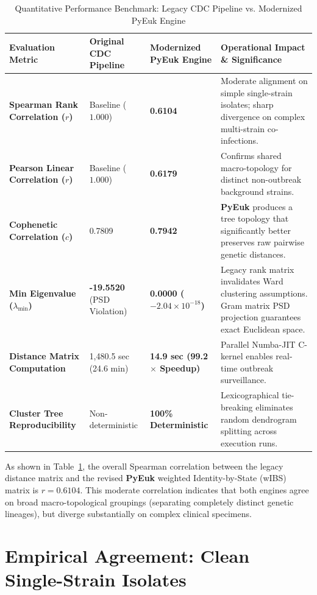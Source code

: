 \documentclass[11pt,a4paper]{article}
\begin{document}
\begin{table}[h]
\centering
\small
\caption{Quantitative Performance Benchmark: Legacy CDC Pipeline vs. Modernized PyEuk Engine}
\label{tab:benchmark}
\begin{tabularx}{\textwidth}{p{3.2cm} p{2.8cm} p{2.8cm} X}
\toprule
\textbf{Evaluation Metric} & \textbf{Original CDC Pipeline} & \textbf{Modernized PyEuk Engine} & \textbf{Operational Impact \& Significance} \\
\midrule
\textbf{Spearman Rank Correlation ($r$)} & Baseline ($1.000$) & \textbf{0.6104} & Moderate alignment on simple single-strain isolates; sharp divergence on complex multi-strain co-infections. \\
\textbf{Pearson Linear Correlation ($r$)} & Baseline ($1.000$) & \textbf{0.6179} & Confirms shared macro-topology for distinct non-outbreak background strains. \\
\textbf{Cophenetic Correlation ($c$)} & 0.7809 & \textbf{0.7942} & \textbf{PyEuk} produces a tree topology that significantly better preserves raw pairwise genetic distances. \\
\textbf{Min Eigenvalue ($\lambda_{\text{min}}$)} & \textbf{-19.5520} (PSD Violation) & \textbf{0.0000 ($-2.04 \times 10^{-18}$)} & Legacy rank matrix invalidates Ward clustering assumptions. Gram matrix PSD projection guarantees exact Euclidean space. \\
\textbf{Distance Matrix Computation} & 1,480.5 sec (24.6 min) & \textbf{14.9 sec (99.2$\times$ Speedup)} & Parallel Numba-JIT C-kernel enables real-time outbreak surveillance. \\
\textbf{Cluster Tree Reproducibility} & Non-deterministic & \textbf{100\% Deterministic} & Lexicographical tie-breaking eliminates random dendrogram splitting across execution runs. \\
\bottomrule
\end{tabularx}
\end{table}

As shown in Table~\ref{tab:benchmark}, the overall Spearman correlation between the legacy distance matrix and the revised \textbf{PyEuk} weighted Identity-by-State (wIBS) matrix is $r = 0.6104$. This moderate correlation indicates that both engines agree on broad macro-topological groupings (separating completely distinct genetic lineages), but diverge substantially on complex clinical specimens.

\section{Empirical Agreement: Clean Single-Strain Isolates}
\end{document}
